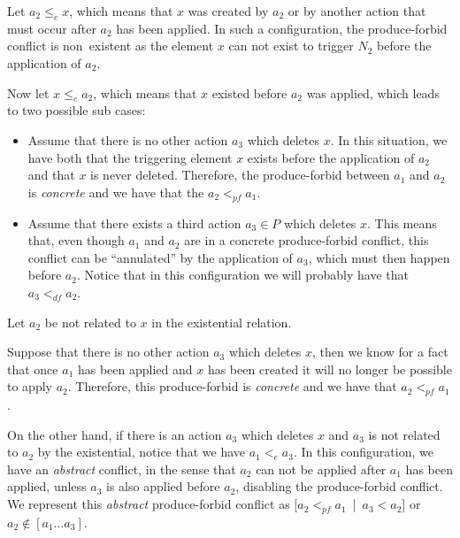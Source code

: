 \begin{description}[style=nextline,leftmargin=*]
  \item[Triggering element is related to the action:]
    Let $a_2 \leq_e x$, which means that $x$ was created by $a_2$ or by another action that must occur after $a_2$ has been applied. In such a configuration, the produce-forbid conflict is \mbox{non existent} as the element $x$ can not exist to trigger $N_2$ before the application of $a_2$.

    Now let $x \leq_e a_2$, which means that $x$ existed before $a_2$ was applied, which leads to two possible sub cases:

    \begin{itemize}
      \item Assume that there is no other action $a_3$ which deletes $x$. In this situation, we have both that the triggering element $x$ exists before the application of $a_2$ and that $x$ is never deleted. Therefore, the produce-forbid between $a_1$ and $a_2$ is \emph{concrete} and we have that the $a_2 <_{pf} a_1$.
      \item Assume that there exists a third action $a_3 \in P$ which deletes $x$. This means that, even though $a_1$ and $a_2$ are in a concrete produce-forbid conflict, this conflict can be ``annulated'' by the application of $a_3$, which must then happen before $a_2$. Notice that in this configuration we will probably have that $a_3 <_{df} a_2$.
    \end{itemize}

  \item[Triggering element is not related to the action:]
    Let $a_2$ be not related to $x$ in the existential relation.

    Suppose that there is no other action $a_3$ which deletes $x$, then we know for a fact that once $a_1$ has been applied and $x$ has been created it will no longer be possible to apply $a_2$. Therefore, this produce-forbid is \emph{concrete} and we have that $a_2 <_{pf} a_1$.

    On the other hand, if there is an action $a_3$ which deletes $x$ and $a_3$ is not related to $a_2$ by the existential, notice that we have $a_1 <_e a_3$. In this configuration, we have an \emph{abstract} conflict, in the sense that $a_2$ can not be applied after $a_1$ has been applied, unless $a_3$ is also applied before $a_2$, disabling the produce-forbid conflict. We represent this \emph{abstract} produce-forbid conflict as \mbox{$[a_2 <_{pf} a_1$ | $a_3 < a_2]$} or $a_2 \not\in [a_1 \ldots a_3]$.
\end{description}

